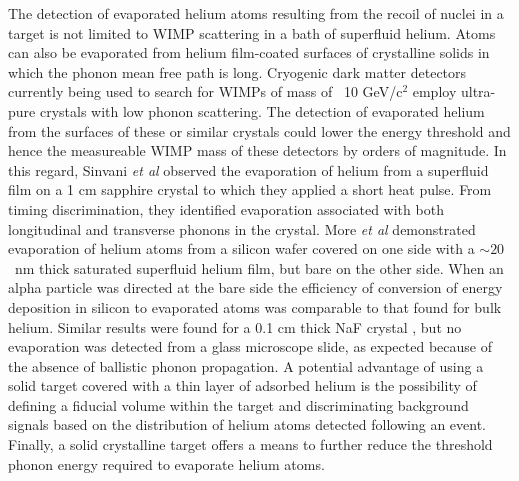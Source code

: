 \documentclass[10pt, letterpaper, reprint, superscriptaddress, aps, prl]
{revtex4-1} \usepackage[latin1]{inputenc}
\begin{document}
The detection of evaporated helium atoms resulting from the recoil of nuclei in a target is not limited to WIMP scattering in a bath of superfluid helium. 
Atoms can also be evaporated from helium film-coated surfaces of crystalline solids in which the phonon mean free path is long.  
Cryogenic dark matter detectors currently being used to search for WIMPs of mass of ~10 GeV/c$^2$ \cite{schneck2015} employ ultra-pure crystals with low phonon scattering. 
The detection of evaporated helium from the surfaces of these or similar crystals could lower the energy threshold and hence the measureable WIMP mass of these detectors by orders of magnitude. 
In this regard, Sinvani {\it et al} \cite{Sinvani1983} observed the evaporation of helium from a superfluid film on a 1 cm sapphire crystal to which they applied a short heat pulse. 
From timing discrimination, they identified evaporation associated with both longitudinal and transverse phonons in the crystal. 
More {\it et al} \cite{More1996} demonstrated evaporation of helium atoms from a silicon wafer covered on one side with a $\sim 20$~nm thick saturated superfluid helium film, but bare on the other side. 
When an alpha particle was directed at the bare side the efficiency of conversion of energy deposition in silicon to evaporated atoms was comparable to that found for bulk helium. 
Similar results were found for a 0.1 cm thick NaF crystal \cite{More1996}, but no evaporation was detected from a glass microscope slide, as expected because of the absence of ballistic phonon propagation. 
A potential advantage of using a solid target covered with a thin layer of adsorbed helium is the possibility of defining a fiducial volume within the target and discriminating background signals based on the distribution of helium atoms detected following an event. 
Finally, a solid crystalline target offers a means to further reduce the threshold phonon energy required to evaporate helium atoms. 
\end{document}
